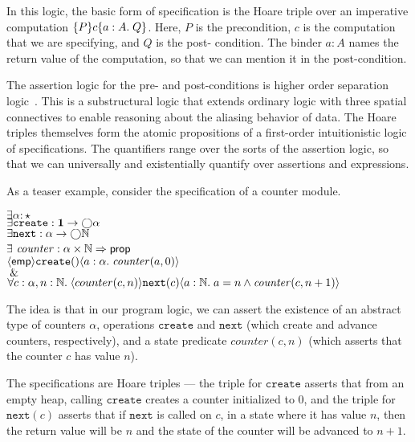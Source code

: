In this logic, the basic form of specification is the Hoare triple
over an imperative computation $\{{P}\}{c}\{{a:A}.\;{Q}\}$. Here, $P$ is the
precondition, $c$ is the computation that we are specifying, and $Q$
is the post- condition. The binder $a:A$ names the return value of the
computation, so that we can mention it in the post-condition.

The assertion logic for the pre- and post-conditions is higher order
separation logic~\citep{hosl}. This is a substructural logic that
extends ordinary logic with three spatial connectives to enable
reasoning about the aliasing behavior of data. The Hoare triples
themselves form the atomic propositions of a first-order
intuitionistic logic of specifications. The quantifiers range over the
sorts of the assertion logic, so that we can universally and
existentially quantify over assertions and expressions.

As a teaser example, consider the specification of a counter module.

\begin{tabbing}
$\exists \alpha : \star$ \\
$\exists \mathtt{create} : \mathbf{1} \to \bigcirc{\alpha}$ \\
$\exists \mathtt{next} : \alpha \to \bigcirc{\mathbb{N}}$ \\
$\exists $\= $\mathit{counter} : \alpha \times \mathbb{N} \Rightarrow \mathsf{prop}$ \\
\> $\langle{\mathsf{emp}}\rangle{\mathtt{create}()}\langle{a:\alpha}.\;{\mathit{counter}(a, 0)}\rangle$ \\
\> $\;\&\;$ \\
\> $\forall c:\alpha, n:\mathbb{N}.\; \langle{counter(c, n)}\rangle{\mathtt{next}(c)}\langle{a:\mathbb{N}}.\;{a = n \land \mathit{counter}(c, n+1)}\rangle$
\\
\end{tabbing} 

The idea is that in our program logic, we can assert the existence of
an abstract type of counters $\alpha$, operations $\mathtt{create}$
and $\mathtt{next}$ (which create and advance counters, respectively),
and a state predicate $\mathit{counter}(c, n)$ (which asserts that the
counter $c$ has value $n$).

The specifications are Hoare triples --- the triple for $\mathtt{create}$ asserts
that from an empty heap, calling $\mathtt{create}$ creates a counter initialized
to 0, and the triple for $\mathtt{next}(c)$ asserts that if $\mathtt{next}$ is called
on $c$, in a state where it has value $n$, then the return value will be $n$ and
the state of the counter will be advanced to $n+1$. 

